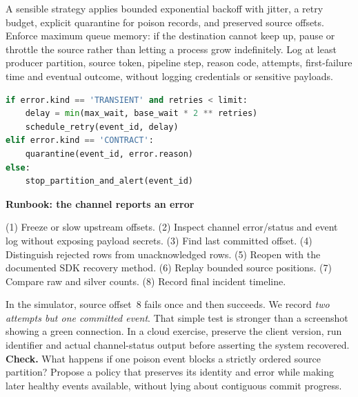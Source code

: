 \documentclass[11pt,twoside]{article}
\begin{document}
A sensible strategy applies bounded exponential backoff with jitter, a retry budget, explicit quarantine for poison records, and preserved source offsets. Enforce maximum queue memory: if the destination cannot keep up, pause or throttle the source rather than letting a process grow indefinitely. Log at least producer partition, source token, pipeline step, reason code, attempts, first-failure time and eventual outcome, without logging credentials or sensitive payloads.
\begin{lstlisting}[language=Python,caption={Illustrative retry decision, not a Snowflake SDK call.}]
if error.kind == 'TRANSIENT' and retries < limit:
    delay = min(max_wait, base_wait * 2 ** retries)
    schedule_retry(event_id, delay)
elif error.kind == 'CONTRACT':
    quarantine(event_id, error.reason)
else:
    stop_partition_and_alert(event_id)
\end{lstlisting}
\begin{whitebox}\textbf{Runbook: the channel reports an error}\par
(1) Freeze or slow upstream offsets. (2) Inspect channel error/status and event log without exposing payload secrets. (3) Find last committed offset. (4) Distinguish rejected rows from unacknowledged rows. (5) Reopen with the documented SDK recovery method. (6) Replay bounded source positions. (7) Compare raw and silver counts. (8) Record final incident timeline.\end{whitebox}
In the simulator, source offset~8 fails once and then succeeds. We record \emph{two attempts but one committed event}. That simple test is stronger than a screenshot showing a green connection. In a cloud exercise, preserve the client version, run identifier and actual channel-status output before asserting the system recovered.
\textbf{Check.} What happens if one poison event blocks a strictly ordered source partition? Propose a policy that preserves its identity and error while making later healthy events available, without lying about contiguous commit progress.
\newpage
\end{document}
